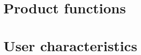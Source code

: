 \documentclass[12pt, a4paper]{report}
\begin{document}
%

\section{Product functions}


\section{User characteristics}


%

%

%


%

%

%

%

%

%

%
\end{document}
